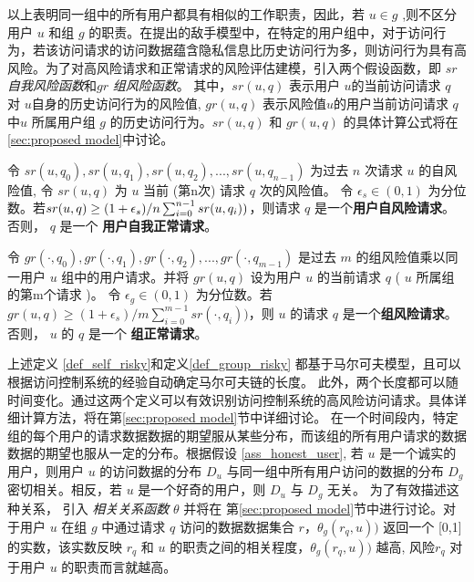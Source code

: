 以上表明同一组中的所有用户都具有相似的工作职责，因此，若 $u \in g$ ,则不区分用户 $u$ 和组 $g$ 的职责。在提出的敌手模型中，在特定的用户组中，对于访问行为，若该访问请求的访问数据蕴含隐私信息比历史访问行为多，则访问行为具有高风险。为了对高风险请求和正常请求的风险评估建模，引入两个假设函数，即 $sr$ \emph{自我风险函数}和$gr$ \emph{组风险函数}。 其中，$sr(u,q)$ 表示用户 $u$的当前访问请求 $q$ 对 $u$自身的历史访问行为的风险值,  $gr(u,q)$ 表示风险值$u$的用户当前访问请求 $q$中$u$ 所属用户组 $g$ 的历史访问行为。$sr(u,q)$ 和 $gr(u,q)$ 的具体计算公式将在 \ref{sec:proposed model}中讨论。

\begin{definition}%
	\label{def_self_risky}
	令 $sr(u, q_0), sr(u, q_1), sr(u, q_2), ... ,sr(u, q_{n-1})$ 为过去 $n$ 次请求 $u$ 的自风险值, 令 $sr(u,q)$ 为 $u$ 当前 (第n次) 请求 $q$ 次的风险值。 令 $\epsilon_s \in (0,1)$ 为分位数。若$sr(u,q) \geq  (1+\epsilon_s) / n  \sum ^{n-1}_{i=0}\\{sr(u,q_i))}$，则请求 $q$ 是一个\textbf{用户自风险请求}。否则， $q$ 是一个 \textbf{用户自我正常请求}。
\end{definition}

\begin{definition}%
	\label{def_group_risky}
	令 $gr(\cdot, q_0), gr(\cdot, q_1), gr(\cdot, q_2), ... , gr(\cdot, q_{m-1})$ 是过去 $m$ 的组风险值乘以同一用户 $u$ 组中的用户请求。并将 $gr(u,q)$ 设为用户 $u$ 的当前请求 $q$  ( $u$ 所属组的第m个请求 )。 令 $\epsilon_g \in (0,1)$ 为分位数。若$gr(u,q) \geq  (1+\epsilon_s) / m  \sum ^{m-1}_{i=0}{sr(\cdot,q_i))}$，则 $u$ 的请求 $q$ 是一个\textbf{组风险请求}。否则， $u$ 的 $q$ 是一个 \textbf{组正常请求}。
\end{definition}


上述定义 \ref{def_self_risky}和定义\ref{def_group_risky} 都基于马尔可夫模型，且可以根据访问控制系统的经验自动确定马尔可夫链的长度。 此外，两个长度都可以随时间变化。通过这两个定义可以有效识别访问控制系统的高风险访问请求。具体详细计算方法，将在第\ref{sec:proposed model}节中详细讨论。 在一个时间段内，特定组的每个用户的请求数据数据的期望服从某些分布，而该组的所有用户请求的数据数据的期望也服从一定的分布。根据假设 \ref{ass_honest_user}, 若 $u$ 是一个诚实的用户，则用户 $u$ 的访问数据的分布 $D_u$ 与同一组中所有用户访问的数据的分布 $D_g$ 密切相关。相反，若 $u$ 是一个好奇的用户，则 $D_u$ 与 $D_g$ 无关。 为了有效描述这种关系， 引入 \emph{相关关系函数} $\theta$ 并将在 第\ref{sec:proposed model}节中进行讨论。对于用户 $u$ 在组 $g$ 中通过请求 $q$ 访问的数据数据集合 $r$，$\theta_g (r_q,u))$ 返回一个 [0,1]的实数，该实数反映 $r_q$ 和 $u$ 的职责之间的相关程度，$\theta_g (r_q,u))$ 越高, 风险$r_q$ 对于用户 $u$ 的职责而言就越高。


